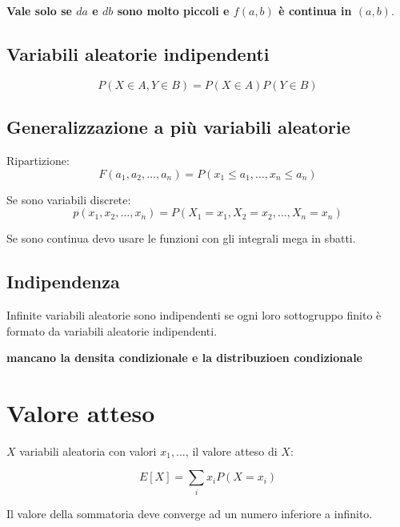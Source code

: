 \textbf{Vale solo se $da$ e $db$ sono molto piccoli e $f(a, b)$ \`{e} continua in $(a, b)$}. 


\subsection{Variabili aleatorie indipendenti}


\begin{equation}
   P(X \in A, Y \in B) = P(X \in A) P(Y \in B) 
\end{equation}

\subsection{Generalizzazione a pi\`{u} variabili aleatorie}

Ripartizione:
\begin{equation}
   F(a_1, a_2, \dots, a_n) = P(x_1 \leq a_1, \dots, x_n \leq a_n) 
\end{equation}

Se sono variabili discrete:
\begin{equation}
   p(x_1, x_2, \dots, x_n) = P(X_1 = x_1, X_2 = x_2, \dots, X_n = x_n) 
\end{equation}


Se sono continua devo usare le funzioni con gli integrali mega in sbatti. 

\subsection{Indipendenza}

Infinite variabili aleatorie sono indipendenti se ogni loro sottogruppo finito \`{e} formato da 
variabili aleatorie indipendenti. 

\textbf{mancano la densita condizionale e la distribuzioen condizionale}

\section{Valore atteso}

$X$ variabili aleatoria con valori $x_1, \dots$, il valore atteso di $X$:

\begin{equation}
   E[X] = \displaystyle\sum_{i} x_i P(X = x_i) 
\end{equation}

Il valore della sommatoria deve converge ad un numero inferiore a infinito. 

